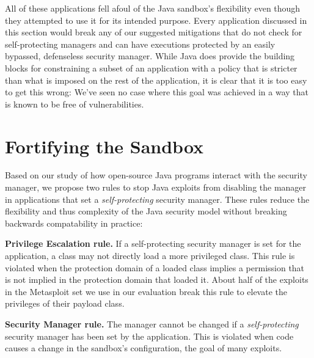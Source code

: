 \documentclass{sig-alternate}
\begin{document}
All of these applications fell afoul of the Java sandbox's flexibility even though they attempted to use it for its intended purpose. Every application discussed in this section would break any of our suggested mitigations that do not check for self-protecting managers and can have executions protected by an easily bypassed, defenseless security manager. While Java does provide the building blocks for constraining a subset of an application with a policy that is stricter than what is imposed on the rest of the application, it is clear that it is too easy to get this wrong: We've seen no case where this goal was achieved in a way that is known to be free of vulnerabilities.

\section{Fortifying the Sandbox}\label{sec:Rules-for-Fortifying}

Based on our study of how open-source Java programs interact with the security
manager, we propose two rules to stop Java exploits
from disabling the manager in applications that set a \emph{self-protecting}
security manager.  These rules reduce the flexibility and thus complexity of the
Java security model without breaking backwards compatability in practice:

\noindent\textbf{Privilege Escalation rule.} If a self-protecting
security manager is set for the application, a class may not directly
load a more privileged class. This rule is violated when the protection
domain of a loaded class implies a permission that is not implied
in the protection domain that loaded it. About half of the exploits in the Metasploit set we use in our evaluation
break this rule to elevate the privileges of their payload
class.

\noindent \textbf{Security Manager rule.} The manager cannot
be changed if a \emph{self-protecting} security manager has been set
by the application. This is violated when code causes a change
in the sandbox's configuration, the goal of many exploits.


\end{document}
